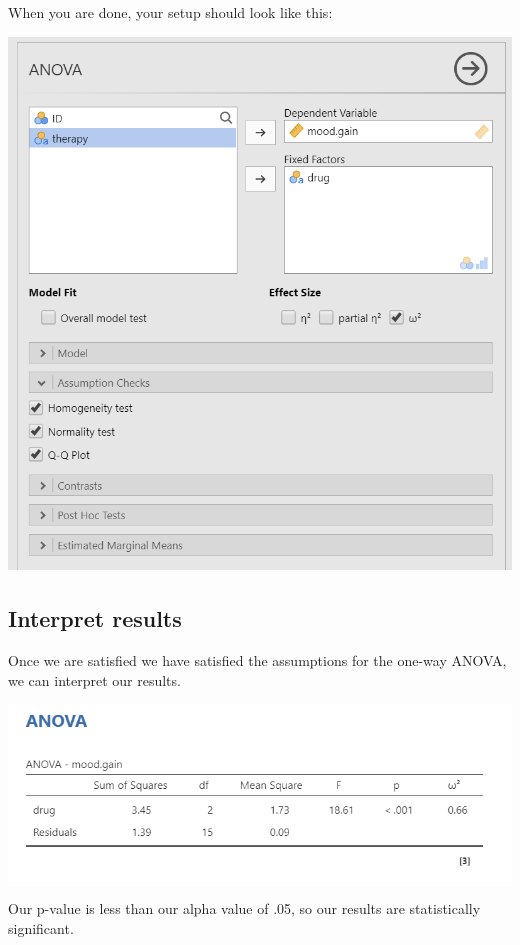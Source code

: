 \documentclass[
]{book}
\begin{document}
When you are done, your setup should look like this:

\includegraphics{images/04_one-way-anova/one-way_setup.png}

\hypertarget{interpret-results-4}{%
\subsection{Interpret results}\label{interpret-results-4}}

Once we are satisfied we have satisfied the assumptions for the one-way ANOVA, we can interpret our results.

\includegraphics{images/04_one-way-anova/one-way_results.png}

Our p-value is less than our alpha value of .05, so our results are statistically significant.
\end{document}
